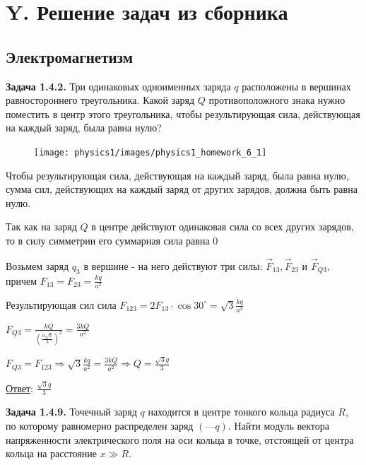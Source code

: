 \documentclass[12pt]{article}
\begin{document}
\clearpage

\section{Y. Решение задач из сборника}

\subsection{Электромагнетизм}

\begin{tcolorbox}
    \textbf{Задача 1.4.2.} Три одинаковых одноименных заряда $q$
    расположены в вершинах равностороннего треугольника. Какой
    заряд $Q$ противоположного знака нужно поместить в центр этого
    треугольника, чтобы результирующая сила, действующая на
    каждый заряд, была равна нулю?
\end{tcolorbox}

\begin{minipage}{\textwidth}
    \begin{figure}
        \texttt{[image: physics1/images/physics1\_homework\_6\_1]}
    \end{figure}

    Чтобы результирующая сила, действующая на каждый заряд, была равна нулю, сумма сил, 
    действующих на каждый заряд от других зарядов, должна быть равна нулю.

    Так как на заряд $Q$ в центре действуют одинаковая сила со всех других зарядов, то в силу симметрии его суммарная сила равна 0 

    Возьмем заряд $q_3$ в вершине - на него действуют три силы: $\vec{F}_{13}, \vec{F}_{23}$ и $\vec{F}_{Q3}$, причем $F_{13} = F_{23} = \frac{kq}{a^2}$

    Результирующая сил сила $F_{123} = 2F_{13} \cdot \cos 30^\circ = \sqrt{3}\frac{kq}{a^2}$

    $F_{Q3} = \frac{kQ}{\left(\frac{a\sqrt{3}}{3}\right)^2} = \frac{3kQ}{a^2}$

    $F_{Q3} = F_{123} \Longrightarrow \sqrt{3}\frac{kq}{a^2} = \frac{3kQ}{a^2} \Longrightarrow Q = \frac{\sqrt{3}q}{3}$
\end{minipage}

\underline{Ответ}: $\frac{\sqrt{3}q}{3}$

\begin{tcolorbox}
    \textbf{Задача 1.4.9.} Точечный заряд $q$ находится в центре тонкого
    кольца радиуса $R$, по которому равномерно распределен заряд $(—q)$.
    Найти модуль вектора напряженности электрического поля на оси
    кольца в точке, отстоящей от центра кольца на расстояние $x \gg R$.
\end{tcolorbox}
\end{document}

